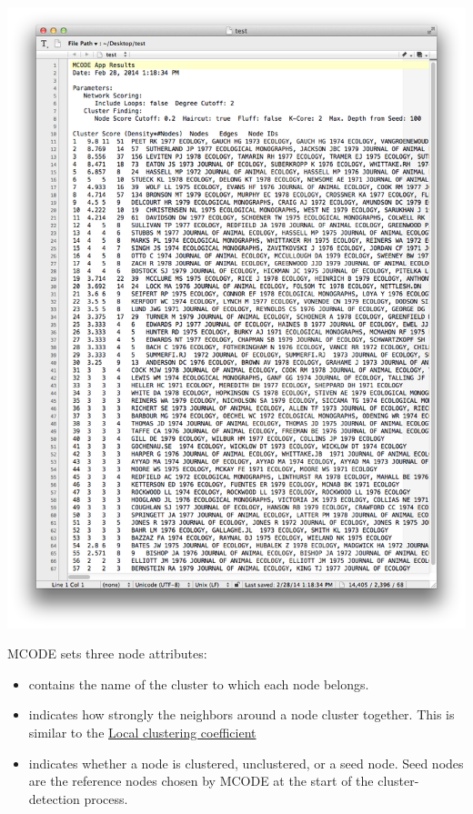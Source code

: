 \documentclass[letterpaper,10pt,english]{sphinxmanual}
\begin{document}
{\hfill\includegraphics{cyto.9.png}\hfill}

MCODE sets three node attributes:
\begin{itemize}
\item {} 
 contains the name of the cluster to which each node belongs.

\item {} 
 indicates how strongly the neighbors around a node cluster together.
This is similar to the \href{http://en.wikipedia.org/wiki/Clustering\_coefficient\#Local\_clustering\_coefficient}{Local clustering coefficient}

\item {} 
 indicates whether a node is clustered, unclustered, or a seed
node. Seed nodes are the reference nodes chosen by MCODE at the start of the
cluster-detection process.

\end{itemize}
\end{document}
